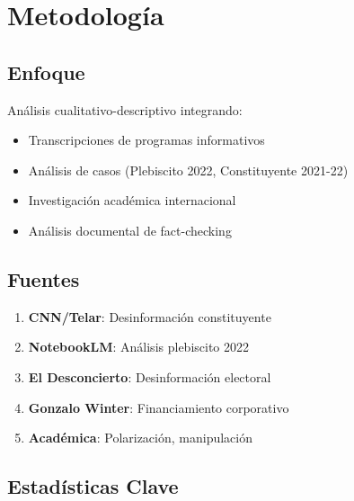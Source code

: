 
\hypertarget{sec3}{\section{Metodología}}\label{sec3}

\subsection{Enfoque}

Análisis cualitativo-descriptivo integrando:
\begin{itemize}
    \itemsep=0.12cm
    \item Transcripciones de programas informativos
    \item Análisis de casos (Plebiscito 2022, Constituyente 2021-22)
    \item Investigación académica internacional
    \item Análisis documental de fact-checking
\end{itemize}

\subsection{Fuentes}

\begin{enumerate}
    \itemsep=0.12cm
    \item \textbf{CNN/Telar}: Desinformación constituyente
    \item \textbf{NotebookLM}: Análisis plebiscito 2022
    \item \textbf{El Desconcierto}: Desinformación electoral
    \item \textbf{Gonzalo Winter}: Financiamiento corporativo
    \item \textbf{Académica}: Polarización, manipulación
\end{enumerate}

\subsection{Estadísticas Clave}

